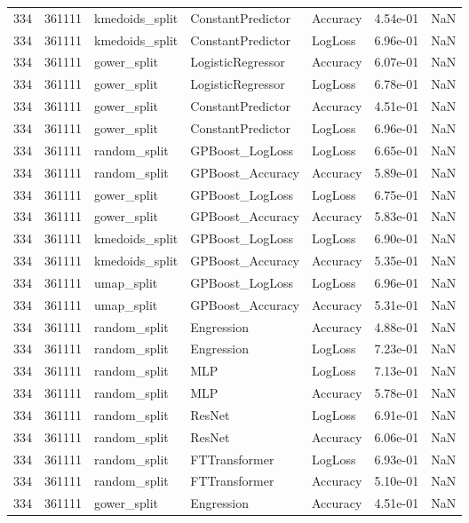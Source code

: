 \begin{tabular}{rrlllrr}
334 & 361111 & kmedoids\_split & ConstantPredictor & Accuracy & 4.54e-01 & NaN \\
334 & 361111 & kmedoids\_split & ConstantPredictor & LogLoss & 6.96e-01 & NaN \\
334 & 361111 & gower\_split & LogisticRegressor & Accuracy & 6.07e-01 & NaN \\
334 & 361111 & gower\_split & LogisticRegressor & LogLoss & 6.78e-01 & NaN \\
334 & 361111 & gower\_split & ConstantPredictor & Accuracy & 4.51e-01 & NaN \\
334 & 361111 & gower\_split & ConstantPredictor & LogLoss & 6.96e-01 & NaN \\
334 & 361111 & random\_split & GPBoost\_LogLoss & LogLoss & 6.65e-01 & NaN \\
334 & 361111 & random\_split & GPBoost\_Accuracy & Accuracy & 5.89e-01 & NaN \\
334 & 361111 & gower\_split & GPBoost\_LogLoss & LogLoss & 6.75e-01 & NaN \\
334 & 361111 & gower\_split & GPBoost\_Accuracy & Accuracy & 5.83e-01 & NaN \\
334 & 361111 & kmedoids\_split & GPBoost\_LogLoss & LogLoss & 6.90e-01 & NaN \\
334 & 361111 & kmedoids\_split & GPBoost\_Accuracy & Accuracy & 5.35e-01 & NaN \\
334 & 361111 & umap\_split & GPBoost\_LogLoss & LogLoss & 6.96e-01 & NaN \\
334 & 361111 & umap\_split & GPBoost\_Accuracy & Accuracy & 5.31e-01 & NaN \\
334 & 361111 & random\_split & Engression & Accuracy & 4.88e-01 & NaN \\
334 & 361111 & random\_split & Engression & LogLoss & 7.23e-01 & NaN \\
334 & 361111 & random\_split & MLP & LogLoss & 7.13e-01 & NaN \\
334 & 361111 & random\_split & MLP & Accuracy & 5.78e-01 & NaN \\
334 & 361111 & random\_split & ResNet & LogLoss & 6.91e-01 & NaN \\
334 & 361111 & random\_split & ResNet & Accuracy & 6.06e-01 & NaN \\
334 & 361111 & random\_split & FTTransformer & LogLoss & 6.93e-01 & NaN \\
334 & 361111 & random\_split & FTTransformer & Accuracy & 5.10e-01 & NaN \\
334 & 361111 & gower\_split & Engression & Accuracy & 4.51e-01 & NaN \\

\end{tabular}
